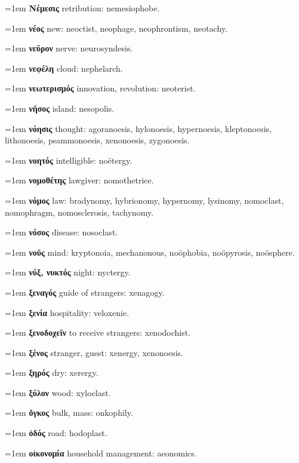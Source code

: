 \hangindent=1em \textbf{Νέμεσις} retribution: nemesiophobe.\par
\hangindent=1em \textbf{νέος} new: neoctist, neophage, neophrontism, neotachy.\par
\hangindent=1em \textbf{νεῦρον} nerve: neurosyndesis.\par
\hangindent=1em \textbf{νεφέλη} cloud: nephelarch.\par
\hangindent=1em \textbf{νεωτερισμός} innovation, revolution: neoterist.\par
\hangindent=1em \textbf{νῆσος} island: nesopolis.\par
\hangindent=1em \textbf{νόησις} thought: agoranoesis, hylonoesis, hypernoesis, kleptonoesis, lithonoesis, psammonoesis, xenonoesis, zygonoesis.\par
\hangindent=1em \textbf{νοητός} intelligible: noëtergy.\par
\hangindent=1em \textbf{νομοθέτης} lawgiver: nomothetrice.\par
\hangindent=1em \textbf{νόμος} law: bradynomy, hybrionomy, hypernomy, lysinomy, nomoclast, nomophragm, nomosclerosis, tachynomy.\par
\hangindent=1em \textbf{νόσος} disease: nosoclast.\par
\hangindent=1em \textbf{νοῦς} mind: kryptonoia, mechanonous, noöphobia, noöpyrosis, noösphere.\par
\hangindent=1em \textbf{νύξ, νυκτός} night: nyctergy.\par
\hangindent=1em \textbf{ξεναγός} guide of strangers: xenagogy.\par
\hangindent=1em \textbf{ξενία} hospitality: veloxenie.\par
\hangindent=1em \textbf{ξενοδοχεῖν} to receive strangers: xenodochist.\par
\hangindent=1em \textbf{ξένος} stranger, guest: xenergy, xenonoesis.\par
\hangindent=1em \textbf{ξηρός} dry: xerergy.\par
\hangindent=1em \textbf{ξύλον} wood: xyloclast.\par
\hangindent=1em \textbf{ὄγκος} bulk, mass: onkophily.\par
\hangindent=1em \textbf{ὁδός} road: hodoplast.\par
\hangindent=1em \textbf{οἰκονομία} household management: aeonomics.\par

